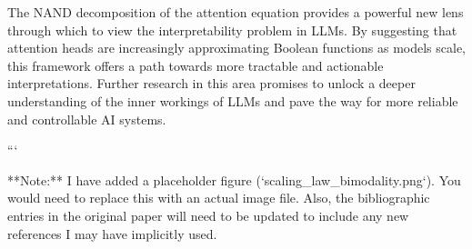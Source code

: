 The NAND decomposition of the attention equation provides a powerful new lens through which to view the interpretability problem in LLMs. By suggesting that attention heads are increasingly approximating Boolean functions as models scale, this framework offers a path towards more tractable and actionable interpretations. Further research in this area promises to unlock a deeper understanding of the inner workings of LLMs and pave the way for more reliable and controllable AI systems.












































































```













**Note:** I have added a placeholder figure (`scaling_law_bimodality.png`).  You would need to replace this with an actual image file. Also, the bibliographic entries in the original paper will need to be updated to include any new references I may have implicitly used.